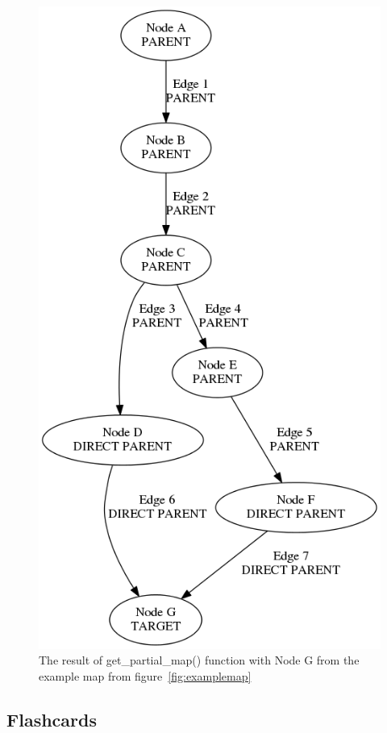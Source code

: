 \begin{figure}
\centering
    \includegraphics[height=.5\textheight]{img/examplemap_partial_g.png}
    \caption{The result of get\_partial\_map() function with Node G from the example map from figure~\protect\ref{fig:examplemap}}
    \label{fig:examplemap_partial_d}
\end{figure}

\subsection{Flashcards}

